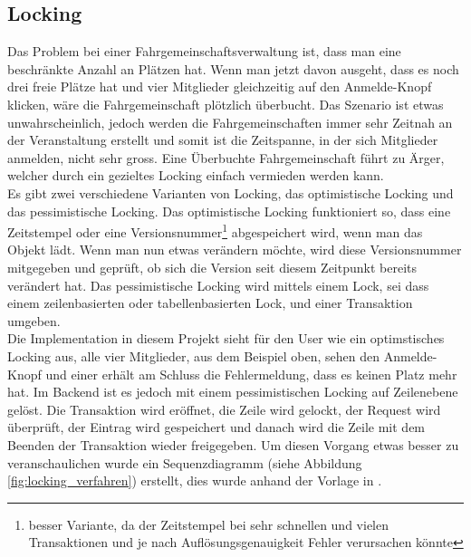 \subsection{Locking}
Das Problem bei einer Fahrgemeinschaftsverwaltung ist, dass man eine beschränkte Anzahl an Plätzen hat. Wenn man jetzt davon ausgeht, dass es noch drei freie Plätze hat und vier Mitglieder gleichzeitig auf den Anmelde-Knopf klicken, wäre die Fahrgemeinschaft plötzlich überbucht. Das Szenario ist etwas unwahrscheinlich, jedoch werden die Fahrgemeinschaften immer sehr Zeitnah an der Veranstaltung erstellt und somit ist die Zeitspanne, in der sich Mitglieder anmelden, nicht sehr gross. Eine Überbuchte Fahrgemeinschaft führt zu Ärger, welcher durch ein gezieltes Locking einfach vermieden werden kann.\\

Es gibt zwei verschiedene Varianten von Locking, das optimistische Locking und das pessimistische Locking. Das optimistische Locking funktioniert so, dass eine Zeitstempel oder eine Versionsnummer\footnote{besser Variante, da der Zeitstempel bei sehr schnellen und vielen Transaktionen und je nach Auflösungsgenauigkeit Fehler verursachen könnte} abgespeichert wird, wenn man das Objekt lädt. Wenn man nun etwas verändern möchte, wird diese Versionsnummer mitgegeben und geprüft, ob sich die Version seit diesem Zeitpunkt bereits verändert hat. Das pessimistische Locking wird mittels einem Lock, sei dass einem zeilenbasierten oder tabellenbasierten Lock, und einer Transaktion umgeben.\\

Die Implementation in diesem Projekt sieht für den User wie ein optimstisches Locking aus, alle vier Mitglieder, aus dem Beispiel oben, sehen den Anmelde-Knopf und einer erhält am Schluss die Fehlermeldung, dass es keinen Platz mehr hat. Im Backend ist es jedoch mit einem pessimistischen Locking auf Zeilenebene gelöst. Die Transaktion wird eröffnet, die Zeile wird gelockt, der Request wird überprüft, der Eintrag wird gespeichert und danach wird die Zeile mit dem Beenden der Transaktion wieder freigegeben. Um diesen Vorgang etwas besser zu veranschaulichen wurde ein Sequenzdiagramm (siehe Abbildung \ref{fig:locking_verfahren}) erstellt, dies wurde anhand der Vorlage in \cite{soft_arch_book}.

